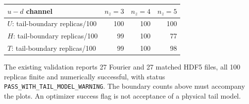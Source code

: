 \documentclass[11pt]{article}
\numberwithin{equation}{section}
\begin{document}
\begin{center}
\begin{tabular}{lrrr}
\toprule
\(u-d\) channel & \(n_z=3\) & \(n_z=4\) & \(n_z=5\)\\
\midrule
\(U\): tail-boundary replicas/100 & 100 & 100 & 100\\
\(H\): tail-boundary replicas/100 & 99 & 100 & 77\\
\(T\): tail-boundary replicas/100 & 99 & 100 & 98\\
\bottomrule
\end{tabular}
\end{center}
The existing validation reports 27 Fourier and 27 matched HDF5 files,
all 100 replicas finite and numerically successful, with status
\texttt{PASS\_WITH\_TAIL\_MODEL\_WARNING}.
The boundary counts above must accompany the plots. An optimizer success
flag is not acceptance of a physical tail model.
\end{document}
